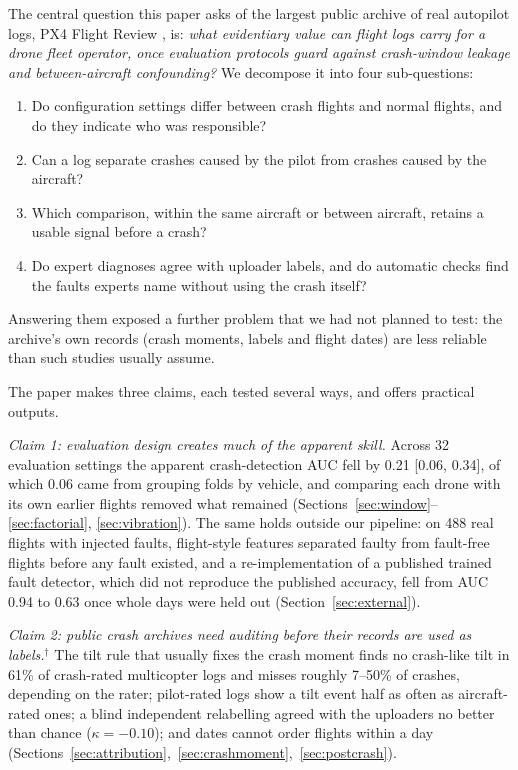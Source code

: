 \documentclass[preprint,12pt]{elsarticle}
\begin{document}
The central question this paper asks of the largest public archive of real autopilot logs, PX4 Flight Review
\cite{meier2015px4,px4flightreview}, is: \textit{what evidentiary value can flight logs carry for a drone fleet
operator, once evaluation protocols guard against crash-window leakage and between-aircraft confounding?} We decompose it into four sub-questions:
\begin{enumerate}
\item[Q1] Do configuration settings differ between crash flights and normal flights, and do they indicate who was responsible?
\item[Q2] Can a log separate crashes caused by the pilot from crashes caused by the aircraft?
\item[Q3] Which comparison, within the same aircraft or between aircraft, retains a usable signal before a crash?
\item[Q4] Do expert diagnoses agree with uploader labels, and do automatic checks find the faults experts name without using the crash itself?
\end{enumerate}
Answering them exposed a further problem that we had not planned to test: the archive's own records (crash moments, labels and flight dates) are less reliable than such studies usually assume.

The paper makes three claims, each tested several ways, and offers practical outputs.

\emph{Claim 1: evaluation design creates much of the apparent skill.} Across 32 evaluation settings the apparent crash-detection AUC fell by 0.21 [0.06, 0.34], of which 0.06 came from grouping folds by vehicle, and comparing each drone with its own earlier flights removed what remained (Sections~\ref{sec:window}--\ref{sec:factorial}, \ref{sec:vibration}). The same holds outside our pipeline: on 488 real flights with injected faults, flight-style features separated faulty from fault-free flights before any fault existed, and a re-implementation of a published trained fault detector, which did not reproduce the published accuracy, fell from AUC 0.94 to 0.63 once whole days were held out (Section~\ref{sec:external}).

\emph{Claim 2: public crash archives need auditing before their records are used as labels.}$^\dagger$ The tilt rule that usually fixes the crash moment finds no crash-like tilt in 61\% of crash-rated multicopter logs and misses roughly 7--50\% of crashes, depending on the rater; pilot-rated logs show a tilt event half as often as aircraft-rated ones; a blind independent relabelling agreed with the uploaders no better than chance ($\kappa=-0.10$); and dates cannot order flights within a day (Sections~\ref{sec:attribution},~\ref{sec:crashmoment},~\ref{sec:postcrash}).
\end{document}
